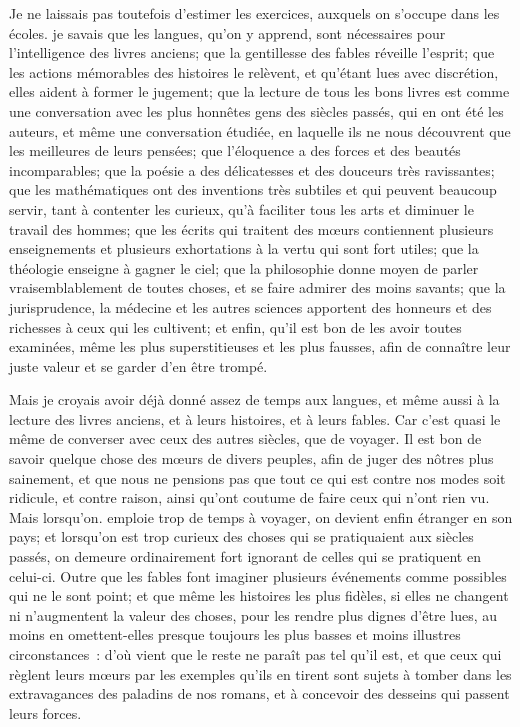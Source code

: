 \documentclass[french,twoside]{book} %
\begin{document}
Je ne laissais pas toutefois d'estimer les exercices, auxquels on s'occupe dans les écoles. je savais que les langues, qu'on y apprend, sont nécessaires pour l'intelligence des livres anciens; que la gentillesse des fables réveille l'esprit; que les actions mémorables des histoires le relèvent, et qu'étant lues avec discrétion, elles aident à former le jugement; que la lecture de tous les bons livres est comme une conversation avec les plus honnêtes gens des siècles passés, qui en ont été les auteurs, et même une conversation étudiée, en laquelle ils ne nous découvrent que les meilleures de leurs pensées; que l'éloquence a des forces et des beautés incomparables; que la poésie a des délicatesses et des douceurs très ravissantes; que les mathématiques ont des inventions très subtiles et qui peuvent beaucoup servir, tant à contenter les curieux, qu'à faciliter tous les arts et diminuer le travail des hommes; que les écrits qui traitent des mœurs contiennent plusieurs enseignements et plusieurs exhortations à la vertu qui sont fort utiles; que la théologie enseigne à gagner le ciel; que la philosophie donne moyen de parler vraisemblablement de toutes choses, et se faire admirer des moins savants; que la jurisprudence, la médecine et les autres sciences apportent des honneurs et des richesses à ceux qui les cultivent; et enfin, qu'il est bon de les avoir toutes examinées, même les plus superstitieuses et les plus fausses, afin de connaître leur juste valeur et se garder d'en être trompé.\par
Mais je croyais avoir déjà donné assez de temps aux langues, et même aussi à la lecture des livres anciens, et à leurs histoires, et à leurs fables. Car c'est quasi le même de converser avec ceux des autres siècles, que de voyager. Il est bon de savoir quelque chose des mœurs de divers peuples, afin de juger des nôtres plus sainement, et que nous ne pensions pas que tout ce qui est contre nos modes soit ridicule, et contre raison, ainsi qu'ont coutume de faire ceux qui n'ont rien vu. Mais lorsqu'on. emploie trop de temps à voyager, on devient enfin étranger en son pays; et lorsqu'on est trop curieux des choses qui se pratiquaient aux siècles passés, on demeure ordinairement fort ignorant de celles qui se pratiquent en celui-ci. Outre que les fables font imaginer plusieurs événements comme possibles qui ne le sont point; et que même les histoires les plus fidèles, si elles ne changent ni n'augmentent la valeur des choses, pour les rendre plus dignes d'être lues, au moins en omettent-elles presque toujours les plus basses et moins illustres circonstances : d'où vient que le reste ne paraît pas tel qu'il est, et que ceux qui règlent leurs mœurs par les exemples qu'ils en tirent sont sujets à tomber dans les extravagances des paladins de nos romans, et à concevoir des desseins qui passent leurs forces.\par
\end{document}
